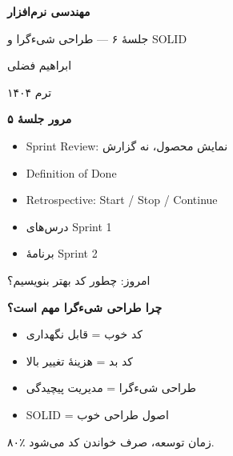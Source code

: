 \documentclass[14pt, a4paper, landscape]{extarticle}
\newcommand{\slide}[1]{%
    \newpage
    \begin{center}
    \begin{minipage}[t]{0.95\textwidth}
    \vspace{0.5cm}
    #1
    \vspace{0.5cm}
    \end{minipage}
    \end{center}
}
\newcommand{\slidetitle}[1]{%
    \begin{center}
        {\LARGE\bfseries\textcolor{primary}{#1}}
    \end{center}
    \vspace{0.5cm}
}
\newcommand{\myaccent}[1]{\textcolor{accent}{#1}}
\begin{document}
\pagestyle{empty}


\begin{center}
    \vspace*{4cm}
    {\color{white}\Huge\bfseries مهندسی نرم‌افزار}
    
    \vspace{1cm}
    
    {\color{accent}\LARGE جلسهٔ ۶ — طراحی شیءگرا و SOLID}
    
    \vspace{2cm}
    
    {\color{white}\Large ابراهیم فضلی}
    
    \vspace{0.5cm}
    
    {\color{white}\large ترم ۱۴۰۴}
\end{center}

\pagestyle{fancy}

\slide{
    \slidetitle{مرور جلسهٔ ۵}
    \vspace{0.5cm}
    \begin{itemize}[itemsep=0.5em]
        \item Sprint Review: نمایش محصول، نه گزارش
        \item Definition of Done
        \item Retrospective: Start / Stop / Continue
        \item درس‌های Sprint 1
        \item برنامهٔ Sprint 2
    \end{itemize}
    \vspace{0.5cm}
    \begin{center}
        {\myaccent{امروز: چطور کد بهتر بنویسیم؟}}
    \end{center}
}

\slide{
    \slidetitle{چرا طراحی شیءگرا مهم است؟}
    \vspace{0.5cm}
    \begin{itemize}[itemsep=0.6em]
        \item {\large کد خوب = قابل نگهداری}
        \item {\large کد بد = هزینهٔ تغییر بالا}
        \item {\large طراحی شیءگرا = مدیریت پیچیدگی}
        \item {\large SOLID = اصول طراحی خوب}
    \end{itemize}
    \vspace{0.8cm}
    \begin{center}
        {\large\myaccent{۸۰٪ زمان توسعه، صرف خواندن کد می‌شود.}}
    \end{center}
}
\end{document}
